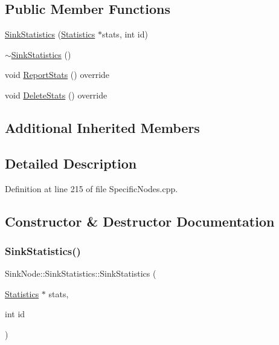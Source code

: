 \subsection*{Public Member Functions}
\begin{DoxyCompactItemize}
\item 
\hyperlink{class_sink_node_1_1_sink_statistics_a28ec0eaaa52bf842b7414f8c67b4bd5d}{Sink\+Statistics} (\hyperlink{class_generic_node_1_1_statistics}{Statistics} $\ast$stats, int id)
\item 
\hyperlink{class_sink_node_1_1_sink_statistics_af8f01207bb1d835b89267a7857c08cb6}{$\sim$\+Sink\+Statistics} ()
\item 
void \hyperlink{class_sink_node_1_1_sink_statistics_a2b8337521bc63a06000571aaede60ad9}{Report\+Stats} () override
\item 
void \hyperlink{class_sink_node_1_1_sink_statistics_a9bd64cbc1cbe5f75ae5bd4971a3453b0}{Delete\+Stats} () override
\end{DoxyCompactItemize}
\subsection*{Additional Inherited Members}


\subsection{Detailed Description}


Definition at line 215 of file Specific\+Nodes.\+cpp.



\subsection{Constructor \& Destructor Documentation}
\mbox{\label{class_sink_node_1_1_sink_statistics_a28ec0eaaa52bf842b7414f8c67b4bd5d}} 
\subsubsection{\texorpdfstring{Sink\+Statistics()}{SinkStatistics()}}
{\footnotesize\ttfamily Sink\+Node\+::\+Sink\+Statistics\+::\+Sink\+Statistics (\begin{DoxyParamCaption}\item[{\hyperlink{class_generic_node_1_1_statistics}{Statistics} $\ast$}]{stats,  }\item[{int}]{id }\end{DoxyParamCaption})\hspace{0.3cm}{\ttfamily [inline]}}



